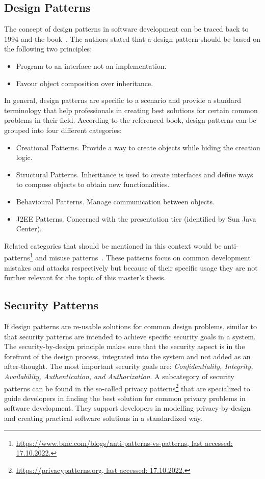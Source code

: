 \subsection{Design Patterns}
The concept of design patterns in software development can be traced back to 1994 and the  book~\cite{Gamma1994}. The authors stated that a design pattern should be based on the following two principles:
\begin{itemize}
	\item Program to an interface not an implementation.
	\item Favour object composition over inheritance.
\end{itemize}
In general, design patterns are specific to a scenario and provide a standard terminology that help professionals in creating best solutions for certain common problems in their field. According to the referenced book, design patterns can be grouped into four different categories: 
\begin{itemize}
	\item Creational Patterns. Provide a way to create objects while hiding the creation logic.
	\item Structural Patterns. Inheritance is used to create interfaces and define ways to compose objects to obtain new functionalities.
	\item Behavioural Patterns. Manage communication between objects.
	\item J2EE Patterns. Concerned with the presentation tier (identified by Sun Java Center).
\end{itemize}
Related categories that should be mentioned in this context would be anti-patterns\footnote{\href{https://www.bmc.com/blogs/anti-patterns-vs-patterns}{https://www.bmc.com/blogs/anti-patterns-vs-patterns, last accessed: 17.10.2022.}} and misuse patterns~\cite{Fernandez2009}. These patterns focus on common development mistakes and attacks respectively but because of their specific usage they are not further relevant for the topic of this master's thesis.

\subsection{Security Patterns}
If design patterns are re-usable solutions for common design problems, similar to that security patterns are intended to achieve specific security goals in a system. The security-by-design principle makes sure that the security aspect is in the forefront of the design process, integrated into the system and not added as an after-thought. The most important security goals are: \emph{Confidentiality, Integrity, Availability, Authentication, and Authorization}. A subcategory of security patterns can be found in the so-called privacy patterns\footnote{\href{https://privacypatterns.org}{https://privacypatterns.org, last accessed: 17.10.2022.}} that are specialized to guide developers in finding the best solution for common privacy problems in software development. They support developers in modelling privacy-by-design and creating practical software solutions in a standardized way.


